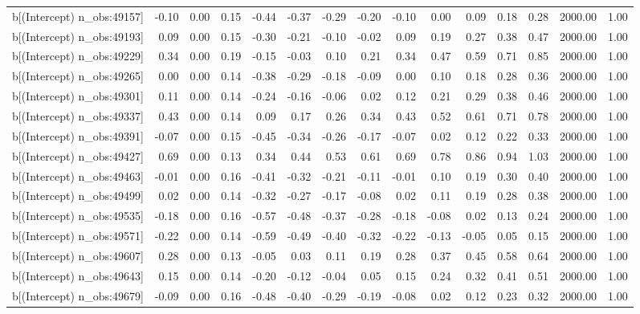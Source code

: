 \begin{table}[ht]
\begin{tabular}{rrrrrrrrrrrrrrr}
  b[(Intercept) n\_obs:49157] & -0.10 & 0.00 & 0.15 & -0.44 & -0.37 & -0.29 & -0.20 & -0.10 & 0.00 & 0.09 & 0.18 & 0.28 & 2000.00 & 1.00 \\ 
  b[(Intercept) n\_obs:49193] & 0.09 & 0.00 & 0.15 & -0.30 & -0.21 & -0.10 & -0.02 & 0.09 & 0.19 & 0.27 & 0.38 & 0.47 & 2000.00 & 1.00 \\ 
  b[(Intercept) n\_obs:49229] & 0.34 & 0.00 & 0.19 & -0.15 & -0.03 & 0.10 & 0.21 & 0.34 & 0.47 & 0.59 & 0.71 & 0.85 & 2000.00 & 1.00 \\ 
  b[(Intercept) n\_obs:49265] & 0.00 & 0.00 & 0.14 & -0.38 & -0.29 & -0.18 & -0.09 & 0.00 & 0.10 & 0.18 & 0.28 & 0.36 & 2000.00 & 1.00 \\ 
  b[(Intercept) n\_obs:49301] & 0.11 & 0.00 & 0.14 & -0.24 & -0.16 & -0.06 & 0.02 & 0.12 & 0.21 & 0.29 & 0.38 & 0.46 & 2000.00 & 1.00 \\ 
  b[(Intercept) n\_obs:49337] & 0.43 & 0.00 & 0.14 & 0.09 & 0.17 & 0.26 & 0.34 & 0.43 & 0.52 & 0.61 & 0.71 & 0.78 & 2000.00 & 1.00 \\ 
  b[(Intercept) n\_obs:49391] & -0.07 & 0.00 & 0.15 & -0.45 & -0.34 & -0.26 & -0.17 & -0.07 & 0.02 & 0.12 & 0.22 & 0.33 & 2000.00 & 1.00 \\ 
  b[(Intercept) n\_obs:49427] & 0.69 & 0.00 & 0.13 & 0.34 & 0.44 & 0.53 & 0.61 & 0.69 & 0.78 & 0.86 & 0.94 & 1.03 & 2000.00 & 1.00 \\ 
  b[(Intercept) n\_obs:49463] & -0.01 & 0.00 & 0.16 & -0.41 & -0.32 & -0.21 & -0.11 & -0.01 & 0.10 & 0.19 & 0.30 & 0.40 & 2000.00 & 1.00 \\ 
  b[(Intercept) n\_obs:49499] & 0.02 & 0.00 & 0.14 & -0.32 & -0.27 & -0.17 & -0.08 & 0.02 & 0.11 & 0.19 & 0.28 & 0.38 & 2000.00 & 1.00 \\ 
  b[(Intercept) n\_obs:49535] & -0.18 & 0.00 & 0.16 & -0.57 & -0.48 & -0.37 & -0.28 & -0.18 & -0.08 & 0.02 & 0.13 & 0.24 & 2000.00 & 1.00 \\ 
  b[(Intercept) n\_obs:49571] & -0.22 & 0.00 & 0.14 & -0.59 & -0.49 & -0.40 & -0.32 & -0.22 & -0.13 & -0.05 & 0.05 & 0.15 & 2000.00 & 1.00 \\ 
  b[(Intercept) n\_obs:49607] & 0.28 & 0.00 & 0.13 & -0.05 & 0.03 & 0.11 & 0.19 & 0.28 & 0.37 & 0.45 & 0.58 & 0.64 & 2000.00 & 1.00 \\ 
  b[(Intercept) n\_obs:49643] & 0.15 & 0.00 & 0.14 & -0.20 & -0.12 & -0.04 & 0.05 & 0.15 & 0.24 & 0.32 & 0.41 & 0.51 & 2000.00 & 1.00 \\ 
  b[(Intercept) n\_obs:49679] & -0.09 & 0.00 & 0.16 & -0.48 & -0.40 & -0.29 & -0.19 & -0.08 & 0.02 & 0.12 & 0.23 & 0.32 & 2000.00 & 1.00 \\ 

\end{tabular}
\end{table}
